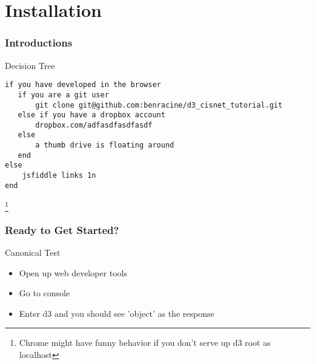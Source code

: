 \documentclass{beamer}
\begin{document}
\section{Installation}

\begin{frame}[fragile]
    \frametitle{Introductions}
    \begin{block}{Decision Tree}
        \begin{verbatim}
if you have developed in the browser
   if you are a git user
       git clone git@github.com:benracine/d3_cisnet_tutorial.git
   else if you have a dropbox account
       dropbox.com/adfasdfasdfasdf
   else
       a thumb drive is floating around
   end
else
    jsfiddle links 1n
end
        \end{verbatim}
    \end{block}
    \footnote{Chrome might have funny behavior if you don't serve up d3 root as localhost}
\end{frame}


\begin{frame}
    \frametitle{Ready to Get Started?}
    \begin{block}{Canonical Test}
        \begin{itemize}
        \item Open up web developer tools
        \item Go to console
        \item Enter d3 and you should see 'object' as the response
        \end{itemize}
    \end{block}
\end{frame}
\end{document}
